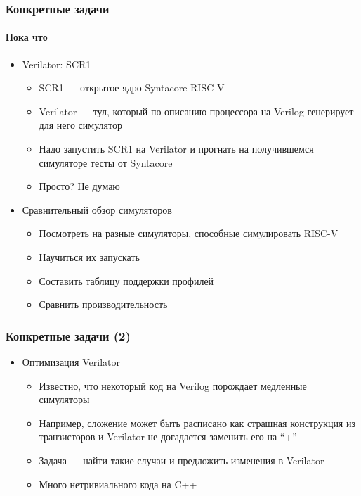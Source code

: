 \documentclass{slides-style}
\begin{document}
    \begin{frame}
        \frametitle{Конкретные задачи}
        \framesubtitle{Пока что}
        \begin{itemize}
            \item Verilator: SCR1
            \begin{itemize}
                \item SCR1 --- открытое ядро Syntacore RISC-V
                \item Verilator --- тул, который по описанию процессора на Verilog генерирует для него симулятор
                \item Надо запустить SCR1 на Verilator и прогнать на получившемся симуляторе тесты от Syntacore
                \item Просто? Не думаю
            \end{itemize}
            \item Сравнительный обзор симуляторов
            \begin{itemize}
                \item Посмотреть на разные симуляторы, способные симулировать RISC-V
                \item Научиться их запускать
                \item Составить таблицу поддержки профилей
                \item Сравнить производительность
            \end{itemize}
        \end{itemize}
    \end{frame}

    \begin{frame}
        \frametitle{Конкретные задачи (2)}
        \begin{itemize}
            \item Оптимизация Verilator
            \begin{itemize}
                \item Известно, что некоторый код на Verilog порождает медленные симуляторы
                \item Например, сложение может быть расписано как страшная конструкция из транзисторов и Verilator не догадается заменить его на ``+''
                \item Задача --- найти такие случаи и предложить изменения в Verilator
                \item Много нетривиального кода на C++
            \end{itemize}
        \end{itemize}
    \end{frame}
\end{document}
